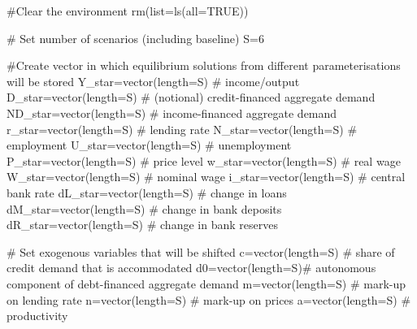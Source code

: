 \documentclass[
  letterpaper,
  DIV=11,
  numbers=noendperiod]{scrreprt}
\newenvironment{Shaded}{\begin{snugshade}}{\end{snugshade}}
\newcommand{\AttributeTok}[1]{\textcolor[rgb]{0.40,0.45,0.13}{#1}}
\newcommand{\CommentTok}[1]{\textcolor[rgb]{0.37,0.37,0.37}{#1}}
\newcommand{\ConstantTok}[1]{\textcolor[rgb]{0.56,0.35,0.01}{#1}}
\newcommand{\DecValTok}[1]{\textcolor[rgb]{0.68,0.00,0.00}{#1}}
\newcommand{\FunctionTok}[1]{\textcolor[rgb]{0.28,0.35,0.67}{#1}}
\newcommand{\NormalTok}[1]{\textcolor[rgb]{0.00,0.23,0.31}{#1}}
\newcommand{\OtherTok}[1]{\textcolor[rgb]{0.00,0.23,0.31}{#1}}
\begin{document}
\begin{Shaded}
\begin{Highlighting}[]
\CommentTok{\#Clear the environment}
\FunctionTok{rm}\NormalTok{(}\AttributeTok{list=}\FunctionTok{ls}\NormalTok{(}\AttributeTok{all=}\ConstantTok{TRUE}\NormalTok{))}

\CommentTok{\# Set number of scenarios (including baseline)}
\NormalTok{S}\OtherTok{=}\DecValTok{6}

\CommentTok{\#Create vector in which equilibrium solutions from different parameterisations will be stored}
\NormalTok{Y\_star}\OtherTok{=}\FunctionTok{vector}\NormalTok{(}\AttributeTok{length=}\NormalTok{S)  }\CommentTok{\# income/output}
\NormalTok{D\_star}\OtherTok{=}\FunctionTok{vector}\NormalTok{(}\AttributeTok{length=}\NormalTok{S)  }\CommentTok{\# (notional) credit{-}financed aggregate demand}
\NormalTok{ND\_star}\OtherTok{=}\FunctionTok{vector}\NormalTok{(}\AttributeTok{length=}\NormalTok{S) }\CommentTok{\# income{-}financed aggregate demand}
\NormalTok{r\_star}\OtherTok{=}\FunctionTok{vector}\NormalTok{(}\AttributeTok{length=}\NormalTok{S)  }\CommentTok{\# lending rate}
\NormalTok{N\_star}\OtherTok{=}\FunctionTok{vector}\NormalTok{(}\AttributeTok{length=}\NormalTok{S)  }\CommentTok{\# employment}
\NormalTok{U\_star}\OtherTok{=}\FunctionTok{vector}\NormalTok{(}\AttributeTok{length=}\NormalTok{S)  }\CommentTok{\# unemployment}
\NormalTok{P\_star}\OtherTok{=}\FunctionTok{vector}\NormalTok{(}\AttributeTok{length=}\NormalTok{S)  }\CommentTok{\# price level}
\NormalTok{w\_star}\OtherTok{=}\FunctionTok{vector}\NormalTok{(}\AttributeTok{length=}\NormalTok{S)  }\CommentTok{\# real wage}
\NormalTok{W\_star}\OtherTok{=}\FunctionTok{vector}\NormalTok{(}\AttributeTok{length=}\NormalTok{S)  }\CommentTok{\# nominal wage}
\NormalTok{i\_star}\OtherTok{=}\FunctionTok{vector}\NormalTok{(}\AttributeTok{length=}\NormalTok{S)  }\CommentTok{\# central bank rate}
\NormalTok{dL\_star}\OtherTok{=}\FunctionTok{vector}\NormalTok{(}\AttributeTok{length=}\NormalTok{S) }\CommentTok{\# change in loans}
\NormalTok{dM\_star}\OtherTok{=}\FunctionTok{vector}\NormalTok{(}\AttributeTok{length=}\NormalTok{S) }\CommentTok{\# change in bank deposits }
\NormalTok{dR\_star}\OtherTok{=}\FunctionTok{vector}\NormalTok{(}\AttributeTok{length=}\NormalTok{S) }\CommentTok{\# change in bank reserves}

\CommentTok{\# Set exogenous variables that will be shifted}
\NormalTok{c}\OtherTok{=}\FunctionTok{vector}\NormalTok{(}\AttributeTok{length=}\NormalTok{S) }\CommentTok{\# share of credit demand that is accommodated}
\NormalTok{d0}\OtherTok{=}\FunctionTok{vector}\NormalTok{(}\AttributeTok{length=}\NormalTok{S)}\CommentTok{\# autonomous component of debt{-}financed aggregate demand}
\NormalTok{m}\OtherTok{=}\FunctionTok{vector}\NormalTok{(}\AttributeTok{length=}\NormalTok{S) }\CommentTok{\# mark{-}up on lending rate}
\NormalTok{n}\OtherTok{=}\FunctionTok{vector}\NormalTok{(}\AttributeTok{length=}\NormalTok{S) }\CommentTok{\# mark{-}up on prices}
\NormalTok{a}\OtherTok{=}\FunctionTok{vector}\NormalTok{(}\AttributeTok{length=}\NormalTok{S) }\CommentTok{\# productivity}


\end{Highlighting}
\end{Shaded}
\end{document}
